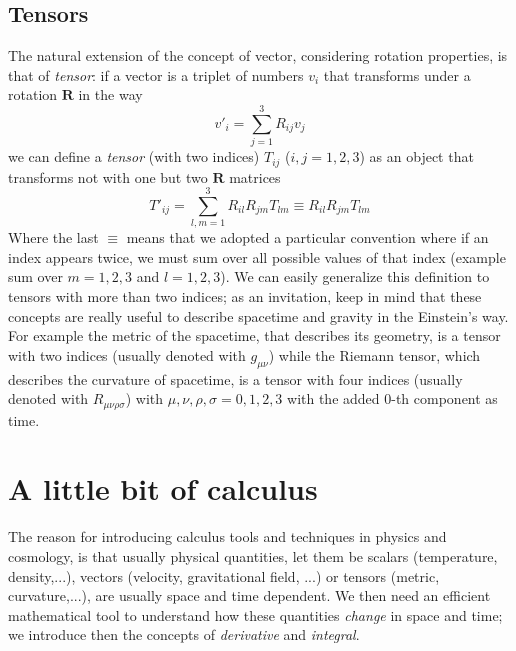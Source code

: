 \documentclass[11pt, a4paper,oneside,openright]{book}
\numberwithin{equation}{section}
\begin{document}
\subsection{Tensors}
The natural extension of the concept of vector, considering rotation properties, is that of \textit{tensor}: if a vector is a triplet of numbers $v_i$ that transforms under a rotation $\mathbf{R}$ in the way
\begin{equation}
v'_i=\sum_{j=1}^3R_{ij}v_j
\end{equation} 
we can define a \textit{tensor} (with two indices) $T_{ij}$ ($i,j=1,2,3$) as an object that transforms not with one but two $\mathbf{R}$ matrices
\begin{equation}
T'_{ij}=\sum_{l,m=1}^3R_{il}R_{jm}T_{lm}\equiv R_{il}R_{jm}T_{lm}
\end{equation}
Where the last $\equiv$ means that we adopted a particular convention where if an index appears twice, we must sum over all possible values of that index (example sum over $m=1,2,3$ and $l=1,2,3$). We can easily generalize this definition to tensors with more than two indices; as an invitation, keep in mind that these concepts are really useful to describe spacetime and gravity in the Einstein's way. For example the metric of the spacetime, that describes its geometry, is a tensor with two indices (usually denoted with $g_{\mu\nu}$) while the Riemann tensor, which describes the curvature of spacetime, is a tensor with four indices (usually denoted with $R_{\mu\nu\rho\sigma}$) with $\mu,\nu,\rho,\sigma=0,1,2,3$ with the added 0-th component as time. 

\section{A little bit of calculus}
The reason for introducing calculus tools and techniques in physics and cosmology, is that usually physical quantities, let them be scalars (temperature, density,...), vectors (velocity, gravitational field, ...) or tensors (metric, curvature,...), are usually space and time dependent. We then need an efficient mathematical tool to understand how these quantities \textit{change} in space and time; we introduce then the concepts of \textit{derivative} and \textit{integral}. 
\end{document}
